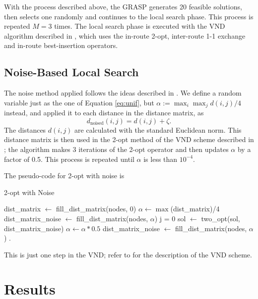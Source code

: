 \documentclass[10pt,twoside]{article}
\begin{document}
With the process described above, the GRASP generates 20 feasible solutions, then selects one randomly and continues to the local search phase. This process is repeated $M=3$ times. The local search phase is executed with the VND algorithm described in \cite{ls}, which uses the in-route 2-opt, inter-route 1-1 exchange and in-route best-insertion operators.

\subsection{Noise-Based Local Search}
The noise method applied follows the ideas described in \cite{charon2001noising}. We define a random variable just as the one of Equation \ref{eq:unif}, but $\alpha:=\max_i\max_j d(i,j)/4$ instead, and applied it to each distance in the distance matrix, as
\[
    d_{\mathrm{noised}}(i,j)=d(i,j)+\zeta.
\]
The distances $d(i,j)$ are calculated with the standard Euclidean norm. This distance matrix is then used in the 2-opt method of the VND scheme described in \cite{ls}; the algorithm makes 3 iterations of the 2-opt operator and then updates $\alpha$ by a factor of 0.5. This process is repeated until $\alpha$ is less than $10^{-4}$.

The pseudo-code for 2-opt with noise is
\begin{algorithm}[H]
  \caption{2-opt with Noise} \label{cod:noise}
  \begin{algorithmic}[1]
        \State dist\_matrix $\gets$ fill\_dist\_matrix(nodes, 0)
        \State $\alpha\gets \max$(dist\_matrix)/4
        \State dist\_matrix\_noise $\gets$ fill\_dist\_matrix(nodes, $\alpha$)
        \State j = 0
            \State sol $\gets$ two\_opt(sol, dist\_matrix\_noise)
        \EndWhile
        \State $\alpha\gets\alpha*0.5$
        \State dist\_matrix\_noise $\gets$ fill\_dist\_matrix(nodes, $\alpha$)
        \EndWhile
    \EndProcedure.
  \end{algorithmic}
\end{algorithm}
This is just one step in the VND; refer to \cite{ls} for the description of the VND scheme.
\section{Results}
\end{document}
